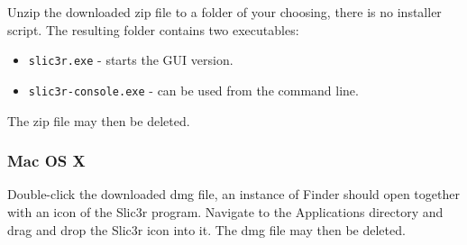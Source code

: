 Unzip the downloaded zip file to a folder of your choosing, there is no installer script. The resulting folder contains two executables:
\begin{itemize}
\item \texttt{slic3r.exe} - starts the GUI version.
\item \texttt{slic3r-console.exe} - can be used from the command line.
\end{itemize}

The zip file may then be deleted.

\subsubsection{Mac OS X}

Double-click the downloaded dmg file, an instance of Finder should open together with an icon of the Slic3r program.  Navigate to the Applications directory and drag and drop the Slic3r icon into it.
The dmg file may then be deleted.


